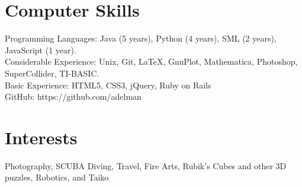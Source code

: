 \documentclass[11pt]{res} %
\begin{document}
\begin{resume}
 
\section{Computer Skills} 
Programming Languages: Java (5 years), Python (4 years), SML (2 years),
JavaScript (1 year).\\
Considerable Experience: Unix, Git, \LaTeX, GnuPlot, Mathematica, Photoshop, SuperCollider, TI-BASIC.\\
Basic Experience: HTML5, CSS3, jQuery, Ruby on Rails\\
GitHub: https://github.com/adelman

\section{Interests} 
Photography, SCUBA Diving, Travel, Fire Arts, Rubik's Cubes and other 3D
puzzles, Robotics, and Taiko 

\end{resume}
\end{document}
